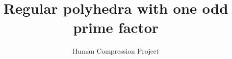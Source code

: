 
\title{Regular polyhedra with one odd prime factor}
\author{Human Compression Project}
\date{}

\maketitle












